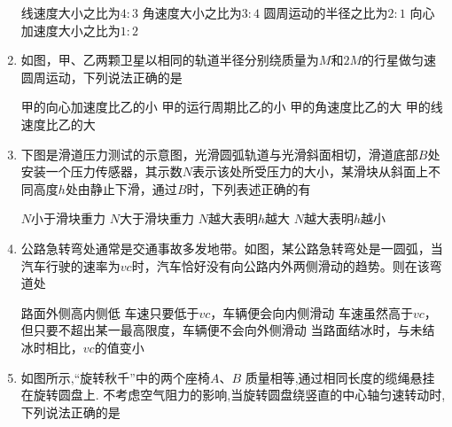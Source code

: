 \begin{enumerate}[leftmargin=0em]
\fourchoices
{线速度大小之比为$ 4:3 $}
{角速度大小之比为$ 3:4 $}
{圆周运动的半径之比为$ 2:1 $}
{向心加速度大小之比为$ 1:2 $}


\newpage	
\item 
{}
如图，甲、乙两颗卫星以相同的轨道半径分别绕质量为$ M $和$ 2M $的行星做匀速圆周运动，下列说法正确的是  

\begin{minipage}[h!]{0.7\linewidth}
\vspace{0.3em}
\fourchoices
{甲的向心加速度比乙的小}
{甲的运行周期比乙的小}
{甲的角速度比乙的大}
{甲的线速度比乙的大}
\vspace{0.3em}
\end{minipage}
\hfill
\begin{minipage}[h!]{0.3\linewidth}
\flushright
\vspace{0.3em}

\vspace{0.3em}
\end{minipage}


\item 
{}
下图是滑道压力测试的示意图，光滑圆弧轨道与光滑斜面相切，滑道底部$ B $处安装一个压力传感器，其示数$ N $表示该处所受压力的大小，某滑块从斜面上不同高度$ h $处由静止下滑，通过$ B $时，下列表述正确的有  
\begin{figure}[h!]
\centering

\end{figure}

\fourchoices
{$ N $小于滑块重力}
{$ N $大于滑块重力}
{$ N $越大表明$ h $越大}
{$ N $越大表明$ h $越小}



\item 
{}
公路急转弯处通常是交通事故多发地带。如图，某公路急转弯处是一圆弧，当汽车行驶的速率为$ vc $时，汽车恰好没有向公路内外两侧滑动的趋势。则在该弯道处  
\begin{figure}[h!]
\centering

\end{figure}

\fourchoices
{路面外侧高内侧低}
{车速只要低于$ vc $，车辆便会向内侧滑动}
{车速虽然高于$ vc $，但只要不超出某一最高限度，车辆便不会向外侧滑动}
{当路面结冰时，与未结冰时相比，$ vc $的值变小}



\item 
{}
如图所示,“旋转秋千”中的两个座椅$ A $、$ B $ 质量相等,通过相同长度的缆绳悬挂在旋转圆盘上. 不考虑空气阻力的影响,当旋转圆盘绕竖直的中心轴匀速转动时,下列说法正确的是  







\end{enumerate}
